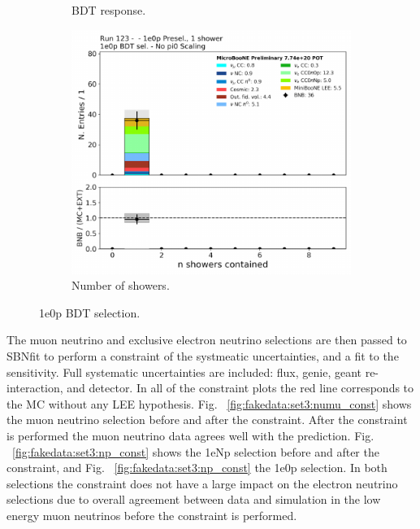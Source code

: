 \begin{figure}[H]
\begin{center}
\begin{subfigure}[b]{0.3\textwidth}
    \caption{\label{fig:fakedata:set3:zp_postsel_bdt} BDT response.}
    \end{subfigure}
    \begin{subfigure}[b]{0.3\textwidth}
    \centering
    \includegraphics[width=1.00\textwidth]{Fakedata/set3/zp_postsel_nshr.pdf}
    \caption{\label{fig:fakedata:set3:zp_postsel_nshr} Number of showers.}
    \end{subfigure}
\caption{\label{fig:fakedata:set3:zpsel} 1e0p BDT selection.}
\end{center}
\end{figure}

The muon neutrino and exclusive electron neutrino selections are then passed to SBNfit to perform a constraint of the systmeatic uncertainties, and a fit to the sensitivity.  Full systematic uncertainties are included: flux, genie, geant re-interaction, and detector.  In all of the constraint plots the red line corresponds to the MC without any LEE hypothesis. Fig. ~\ref{fig:fakedata:set3:numu_const} shows the muon neutrino selection before and after the constraint. After the constraint is performed the muon neutrino data agrees well with the prediction.   
Fig. ~\ref{fig:fakedata:set3:np_const} shows the 1eNp selection before and after the constraint, and Fig. ~\ref{fig:fakedata:set3:np_const} the 1e0p selection.  In both selections the constraint does not have a large impact on the electron neutrino selections due to overall agreement between data and simulation in the low energy muon neutrinos before the constraint is performed.


